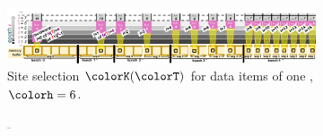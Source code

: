 \begin{figure}[htbp!]
  \flushleft
  \begin{subfigure}[b]{\linewidth}
    \includegraphics[width=\textwidth, trim={0cm 0cm 0cm 1cm}, clip]{img/hsurf-steady-intuition}
    \vspace{-4ex}
    \caption{\footnotesize Site selection $\colorK(\colorT)$ for data items of one \hv{}, $\colorh = 6$.}
    \label{fig:hsurf-steady-intuition-diagram}
  \end{subfigure}
\vspace{-5ex}
  \flushright
  \begin{subfigure}[b]{0.98\linewidth}
    \includegraphics[width=0.011\textwidth, trim={0.2cm 2.8cm 31.8cm 2.8cm}, clip]{binder/teeplots/12/reservation-mode=steady-full+surface-size=32+viz=site-reservation-at-ranks-heatmap+ext=.pdf}%
\end{subfigure}
\end{figure}
